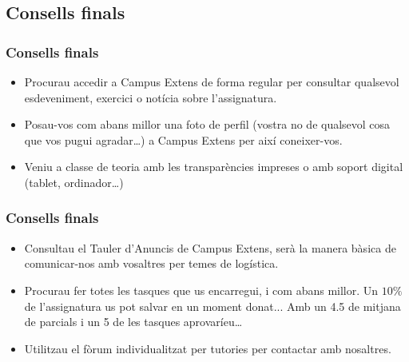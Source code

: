 \documentclass[12pt,t]{beamer}
\renewcommand{\emph}[1]{{\color{red}#1}}
\theoremstyle{plain}
\theoremstyle{definition}
\begin{document}
\subsection{Consells finals}


\begin{frame}
\frametitle{Consells finals}

\begin{itemize}

\item Procurau accedir a Campus Extens de forma regular per consultar qualsevol esdeveniment, exercici o notícia sobre l'assignatura.

\item Posau-vos com abans millor una foto de perfil (vostra no de qualsevol cosa que vos pugui agradar\ldots) a Campus Extens per així­ coneixer-vos. 

\item Veniu a classe de teoria amb les transparències impreses o amb soport digital (tablet, ordinador\ldots)

\end{itemize}
\end{frame}

\begin{frame}
\frametitle{Consells finals}

\begin{itemize}

\item Consultau el \emph{Tauler d'Anuncis de Campus Extens}, serà la manera bàsica de comunicar-nos amb vosaltres per temes de logí­stica.

\item Procurau fer totes les tasques que us encarregui, i com abans millor. Un $10\%$ de l'assignatura us pot salvar en un moment donat... Amb un 4.5 de mitjana de parcials i un 5 de les tasques aprovaríeu\ldots

\item Utilitzau el fòrum individualitzat per tutories per contactar amb nosaltres.

\end{itemize}

\end{frame}
\end{document}
